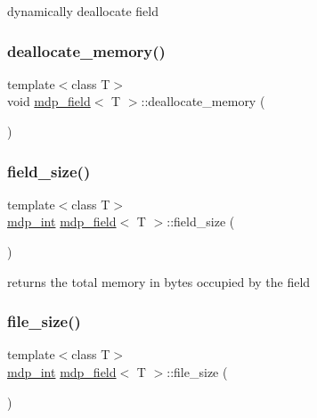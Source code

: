 dynamically deallocate field 

\mbox{\label{classmdp__field_a3c2b219b116a0bb1cb340c3e06c37657}} 
\subsubsection{\texorpdfstring{deallocate\+\_\+memory()}{deallocate\_memory()}}
{\footnotesize\ttfamily template$<$class T$>$ \\
void \hyperlink{classmdp__field}{mdp\+\_\+field}$<$ T $>$\+::deallocate\+\_\+memory (\begin{DoxyParamCaption}{ }\end{DoxyParamCaption})\hspace{0.3cm}{\ttfamily [inline]}}

\mbox{\label{classmdp__field_a6eff9dbb7dd88313ae2294c0178c4c74}} 
\subsubsection{\texorpdfstring{field\+\_\+size()}{field\_size()}}
{\footnotesize\ttfamily template$<$class T$>$ \\
\hyperlink{mdp__global__vars_8h_aaa1ad9d0dcd2124aa5af0120d9954174}{mdp\+\_\+int} \hyperlink{classmdp__field}{mdp\+\_\+field}$<$ T $>$\+::field\+\_\+size (\begin{DoxyParamCaption}{ }\end{DoxyParamCaption})\hspace{0.3cm}{\ttfamily [inline]}}



returns the total memory in bytes occupied by the field 

\mbox{\label{classmdp__field_ac6e5d57963f865e92cc59c3e9943fb3d}} 
\subsubsection{\texorpdfstring{file\+\_\+size()}{file\_size()}}
{\footnotesize\ttfamily template$<$class T$>$ \\
\hyperlink{mdp__global__vars_8h_aaa1ad9d0dcd2124aa5af0120d9954174}{mdp\+\_\+int} \hyperlink{classmdp__field}{mdp\+\_\+field}$<$ T $>$\+::file\+\_\+size (\begin{DoxyParamCaption}{ }\end{DoxyParamCaption})\hspace{0.3cm}{\ttfamily [inline]}}



